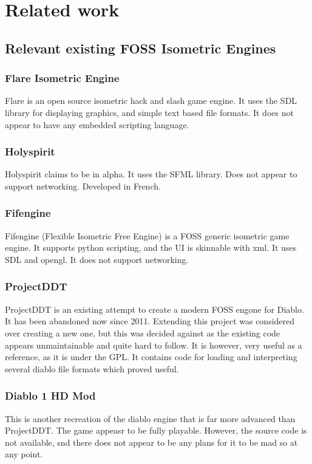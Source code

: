 \chapter{Related work}
    \section{Relevant existing FOSS Isometric Engines}
    	\subsection{Flare Isometric Engine}
    	Flare\cite{flare} is an open source isometric hack and slash game engine. It uses the SDL library for displaying graphics, and simple text based file formats.
    	It does not appear to have any embedded scripting language.
    	
    	\subsection{Holyspirit}
    	Holyspirit\cite{holyspirit} claims to be in alpha. It uses the SFML library. Does not appear to support networking.
    	Developed in French.
    	
    	\subsection{Fifengine}
    	Fifengine\cite{fife} (Flexible Isometric Free Engine) is a FOSS generic isometric game engine.
    	It supports python scripting, and the UI is skinnable with xml.
    	It uses SDL and opengl. It does not support networking.
    	
    	\subsection{ProjectDDT}
    	ProjectDDT\cite{ddt} is an existing attempt to create a modern FOSS engone for Diablo.
    	It has been abandoned now since 2011.
    	Extending this project was considered over creating a new one, but this was decided against as the existing code appears unmaintainable and quite hard to follow.
    	It is however, very useful as a reference, as it is under the GPL.
    	It contains code for loading and interpreting several diablo file formats which proved useful.
    	
    	\subsection{Diablo 1 HD Mod}
    	This\cite{d1hd} is another recreation of the diablo engine that is far more advanced than ProjectDDT. The game appeasr to be fully playable. However, the source code is not available, snd there does not appear to be any plans for it to be mad so at any point.

